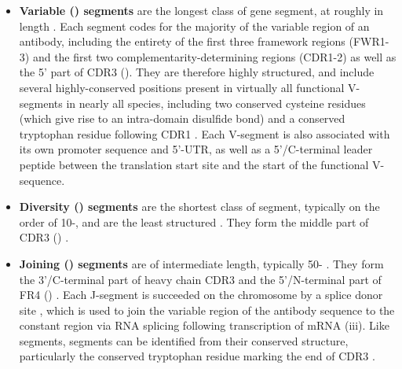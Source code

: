 \begin{itemize}
\item \textbf{Variable (\vh) segments} are the longest class of gene segment, at roughly  in length \parencite{lefranc2003vnumbering}. Each \vh segment codes for the majority of the variable region of an antibody, including the entirety of the first three framework regions (FWR1-3) and the first two complementarity-determining regions (CDR1-2) as well as the 5' part of CDR3 \parencite{schroeder2010immunoglobulins,jung2006vdjr} (). They are therefore highly structured, and include several highly-conserved positions present in virtually all functional V-segments in nearly all species, including two conserved cysteine residues (which give rise to an intra-domain disulfide bond) and a conserved tryptophan residue following CDR1 \parencite{lefranc2003vnumbering}. Each V-segment is also associated with its own promoter sequence and 5'-UTR, as well as a 5'/C-terminal leader peptide between the translation start site and the start of the functional V-sequence.
\item \textbf{Diversity (\dh) segments} are the shortest class of segment, typically on the order of 10-, and are the least structured \parencite{ruiz1999humandj}. They form the middle part of CDR3 () \parencite{schroeder2010immunoglobulins}.
\item \textbf{Joining (\jh) segments} are of intermediate length, typically 50- \parencite{ruiz1999humandj}. They form the 3'/C-terminal part of heavy chain CDR3 and the 5'/N-terminal part of FR4 () \parencite{schroeder2010immunoglobulins}. Each J-segment is succeeded on the chromosome by a splice donor site \parencite{magadan2011medaka}, which is used to join the variable region of the antibody sequence to the constant region via RNA splicing following transcription of \igh{} mRNA (iii). Like \vh segments, \jh segments can be identified from their conserved structure, particularly the conserved tryptophan residue marking the end of CDR3 \parencite{ruiz1999humandj}.
\end{itemize}

